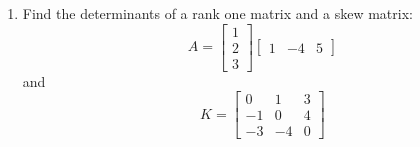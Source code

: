 \begin{enumerate}[label=\arabic*.]
    \item Find the determinants of a rank one matrix and a skew matrix:
        \begin{equation}
            A = 
            \begin{bmatrix}
                1   \\
                2   \\
                3
            \end{bmatrix}
            \begin{bmatrix}
                1       &   -4   &   5
            \end{bmatrix}
        \end{equation}
        and 
        \begin{equation}
            K = 
            \begin{bmatrix}
                0       &       1       &       3   \\
                -1      &       0       &       4   \\
               -3       &       -4      &       0
            \end{bmatrix}
        \end{equation}
\end{enumerate}
